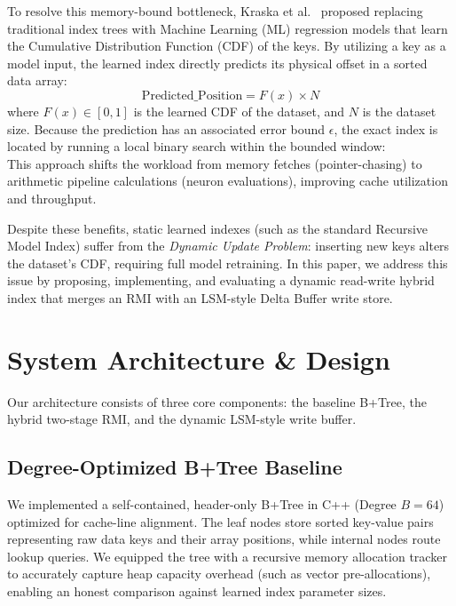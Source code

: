 \documentclass[10pt,twocolumn,a4paper]{article}
\begin{document}
To resolve this memory-bound bottleneck, Kraska et al.~\cite{kraska2018case} proposed replacing traditional index trees with Machine Learning (ML) regression models that learn the Cumulative Distribution Function (CDF) of the keys. By utilizing a key as a model input, the learned index directly predicts its physical offset in a sorted data array:
\begin{equation}
    \text{Predicted\_Position} = F(x) \times N
\end{equation}
where $F(x) \in [0,1]$ is the learned CDF of the dataset, and $N$ is the dataset size. Because the prediction has an associated error bound $\epsilon$, the exact index is located by running a local binary search within the bounded window:
\begin{equation}
    [\text{Predicted\_Position} - \epsilon, \text{Predicted\_Position} + \epsilon]
\end{equation}
This approach shifts the workload from memory fetches (pointer-chasing) to arithmetic pipeline calculations (neuron evaluations), improving cache utilization and throughput. 

Despite these benefits, static learned indexes (such as the standard Recursive Model Index) suffer from the \textit{Dynamic Update Problem}: inserting new keys alters the dataset's CDF, requiring full model retraining. In this paper, we address this issue by proposing, implementing, and evaluating a dynamic read-write hybrid index that merges an RMI with an LSM-style Delta Buffer write store.

\section{System Architecture \& Design}
Our architecture consists of three core components: the baseline B+Tree, the hybrid two-stage RMI, and the dynamic LSM-style write buffer.

\subsection{Degree-Optimized B+Tree Baseline}
We implemented a self-contained, header-only B+Tree in C++ (Degree $B=64$) optimized for cache-line alignment. The leaf nodes store sorted key-value pairs representing raw data keys and their array positions, while internal nodes route lookup queries. We equipped the tree with a recursive memory allocation tracker to accurately capture heap capacity overhead (such as vector pre-allocations), enabling an honest comparison against learned index parameter sizes.
\end{document}
